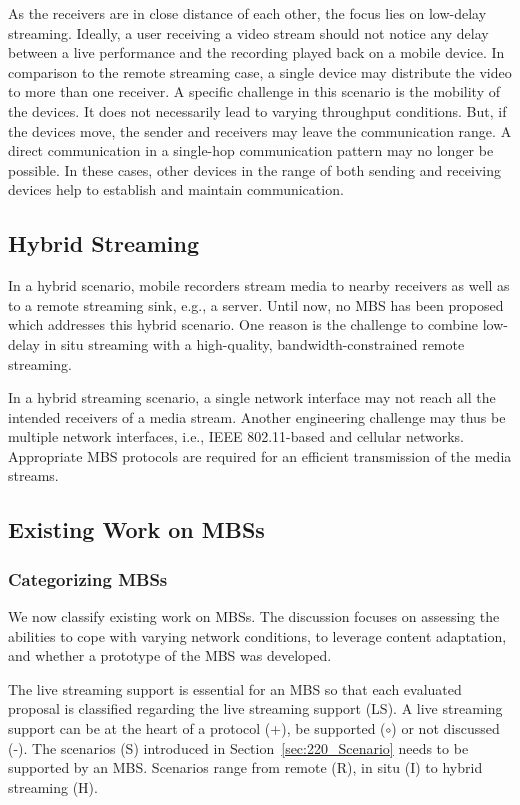 As the receivers are in close distance of each other, the focus lies on low-delay streaming.
Ideally, a user receiving a video stream should not notice any delay between a live performance and the recording played back on a mobile device.
In comparison to the remote streaming case, a single device may distribute the video to more than one receiver.
A specific challenge in this scenario is the mobility of the devices. 
It does not necessarily lead to varying throughput conditions.
But, if the devices move, the sender and receivers may leave the communication range.
A direct communication in a single-hop communication pattern may no longer be possible. 
In these cases, other devices in the range of both sending and receiving devices
help to establish and maintain communication.
\subsection{Hybrid Streaming}
In a hybrid scenario, mobile recorders stream media to nearby receivers as well as to a remote streaming sink, e.g., a server.
Until now, no \ac{MBS} has been proposed which addresses this hybrid scenario.
One reason is the challenge to combine low-delay in situ streaming with a high-quality, bandwidth-constrained remote streaming.

In a hybrid streaming scenario, a single network interface may not reach all the intended receivers of a media stream.
Another engineering challenge may thus be multiple network interfaces, i.e., IEEE 802.11-based and cellular networks.
Appropriate \ac{MBS} protocols are required for an efficient transmission of the media streams. 
\subsection{Existing Work on MBSs}
\subsubsection{Categorizing MBSs}
We now classify existing work on \ac{MBS}s.
The discussion focuses on assessing the abilities to cope with varying network conditions, to leverage content adaptation, and whether a prototype of the \ac{MBS} was developed.

The live streaming support is essential for an \ac{MBS} so that each evaluated proposal is classified regarding the live streaming support (LS).
A live streaming support can be at the heart of a protocol (+), be supported ($\circ$) or not discussed (-). 
The scenarios (S) introduced in Section~\ref{sec:220_Scenario} needs to be supported by an \ac{MBS}.
Scenarios range from remote (R), in situ (I) to hybrid streaming (H).

